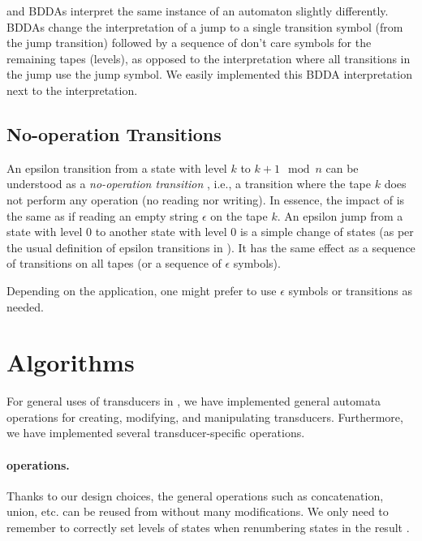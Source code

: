 \nfts and BDDAs interpret the same instance of an \nft automaton slightly differently.
BDDAs change the interpretation of a jump to a single transition symbol (from the jump transition) followed by a sequence of don't care symbols for the remaining tapes (levels), as opposed to the \nft interpretation where all transitions in the jump use the jump symbol.
We easily implemented this BDDA interpretation next to the \nft interpretation.

\subsection{No-operation Transitions}
An epsilon transition from a state with level $k$ to $k+1 \mod n$ can be understood as a \emph{no-operation transition} \nop, i.e., a transition where the tape $k$ does not perform any operation (no reading nor writing). In essence, the impact of \nop is the same as if reading an empty string $\epsilon$ on the tape $k$.
An epsilon jump from a state with level $0$ to another state with level $0$ is a simple change of states (as per the usual definition of epsilon transitions in \nfas).
It has the same effect as a sequence of \nop transitions on all tapes (or a sequence of $\epsilon$ symbols).

Depending on the application, one might prefer to use $\epsilon$ symbols or \nop transitions as needed.

\section{Algorithms}
\label{sec:Algorithms}

For general uses of transducers in \mata, we have implemented general automata operations for creating, modifying, and manipulating transducers.
Furthermore, we have implemented several transducer-specific operations.

\paragraph{\nfa operations.}
Thanks to our design choices, the general \nfa operations such as concatenation, union, etc. can be reused from \nfa without many modifications.
We only need to remember to correctly set levels of states when renumbering states in the result \nft.

